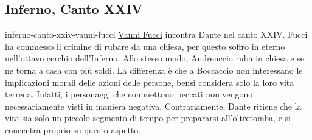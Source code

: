 \documentclass[preview]{standalone}
\begin{document}
\subsection{Inferno, Canto XXIV}

\begin{snippet}{inferno-canto-xxiv-vanni-fucci}
    \href{https://en.wikipedia.org/wiki/Vanni_Fucci}{Vanni Fucci}
    incontra Dante nel canto XXIV. Fucci ha commesso il crimine di
    rubare da una chiesa, per questo soffro in eterno nell'ottavo cerchio dell'Inferno.
    Allo stesso modo, Andreuccio ruba in chiesa e se ne torna a casa con più soldi.
    La differenza è che a Boccaccio non interessano le implicazioni morali delle azioni
    delle persone, bensì considera solo la loro vita terrena.
    Infatti, i personaggi che commettono peccati non vengono necessariamente visti
    in maniera negativa.
    Contrariamente, Dante ritiene che la vita sia solo un piccolo segmento di tempo
    per prepararsi all'oltretomba, e si concentra proprio su questo aspetto.
\end{snippet}
\end{document}
